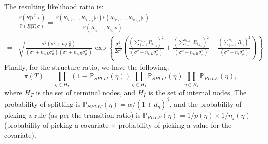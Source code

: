 \documentclass[11pt,a4paper]{article}
\newcommand{\vect}[1]{\underline{#1}}
\newcommand{\prob}{\mathbb{P}}
\begin{document}
The resulting likelihood ratio is:
\begin{equation}
    \label{eq:grow_likelihood_ratio}
    \begin{split}
          & \frac{\prob(\vect{R} | T^*, \sigma)}{\prob(\vect{R} | T, \sigma)} = \frac{\prob(R_{i_{L,1}}, ... , R_{i_{L,n_{i,L}}} | \sigma) \prob(R_{i_{R,1}}, ... , R_{i_{R,n_{i,R}}} | \sigma)}{\prob(R_{i_1}, ... , R_{i_{n_i}} | \sigma)}                                                                                                                                                                                                                        \\
        = & \sqrt{\frac{\sigma^2(\sigma^2 + n_i \sigma^2_\mu)}{(\sigma^2 + n_{i,L}\sigma^2_\mu)(\sigma^2 + n_{i,R}\sigma^2_\mu)}}\exp\left\{\frac{\sigma_\mu^2}{2\sigma^2}\left(\frac{\left(\sum_{j=1}^{n_{i,L}}R_{i_{L,j}}\right)^2}{(\sigma^2 + n_{i,L}\sigma^2_\mu)} + \frac{\left(\sum_{j=1}^{n_{i,R}}R_{i_{R,j}}\right)^2}{(\sigma^2 + n_{i,R}\sigma^2_\mu) }-\frac{\left(\sum_{j=1}^{n_{i}}R_{i_{j}}\right)^2}{(\sigma^2 + n_{i}\sigma^2_\mu)}\right)\right\}
    \end{split}
\end{equation}
Finally, for the structure ratio, we have the following:
\begin{equation}
    \label{eq:tree_struct_prob}
    \pi(T) = \prod_{\eta \in H_T} (1 - \prob_{SPLIT}(\eta)) \prod_{\eta \in H_I} \prob_{SPLIT}(\eta)\prod_{\eta \in H_I} \prob_{RULE}(\eta),
\end{equation}
where $H_T$ is the set of terminal nodes, and $H_I$ is the set of internal nodes.
The probability of splitting is $\prob_{SPLIT}(\eta) = \alpha / (1+d_\eta)^\beta$, and the probability of picking a rule (as per the transition ratio) is $\prob_{RULE}(\eta) = {1}/{p(\eta)} \times {1}/{n_j(\eta)}$ (probability of picking a covariate $\times$ probability of picking a value for the covariate).
\end{document}
